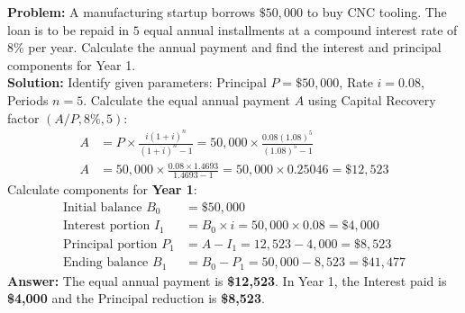 \documentclass[12pt,a4paper]{article}
\begin{document}
\begin{tcolorbox}[examplebox, title={Example 2: Loan Amortization Schedule}]
\textbf{Problem:} A manufacturing startup borrows $\$50,000$ to buy CNC tooling. The loan is to be repaid in $5$ equal annual installments at a compound interest rate of $8\%$ per year. Calculate the annual payment and find the interest and principal components for Year 1.\\[4pt]
\textbf{Solution:}
Identify given parameters: Principal $P = \$50,000$, Rate $i = 0.08$, Periods $n = 5$.
Calculate the equal annual payment $A$ using Capital Recovery factor $(A/P, 8\%, 5)$:
\begin{align*}
  A &= P \times \frac{i(1+i)^n}{(1+i)^n - 1} = 50,000 \times \frac{0.08(1.08)^5}{(1.08)^5 - 1} \\[4pt]
  A &= 50,000 \times \frac{0.08 \times 1.4693}{1.4693 - 1} = 50,000 \times 0.25046 = \$12,523
\end{align*}
Calculate components for \textbf{Year 1}:
\begin{align*}
  \text{Initial balance } B_0 &= \$50,000 \\
  \text{Interest portion } I_1 &= B_0 \times i = 50,000 \times 0.08 = \$4,000 \\
  \text{Principal portion } P_1 &= A - I_1 = 12,523 - 4,000 = \$8,523 \\
  \text{Ending balance } B_1 &= B_0 - P_1 = 50,000 - 8,523 = \$41,477
\end{align*}
\textbf{Answer:} The equal annual payment is \textbf{\$12,523}. In Year 1, the Interest paid is \textbf{\$4,000} and the Principal reduction is \textbf{\$8,523}.
\end{tcolorbox}
\end{document}
